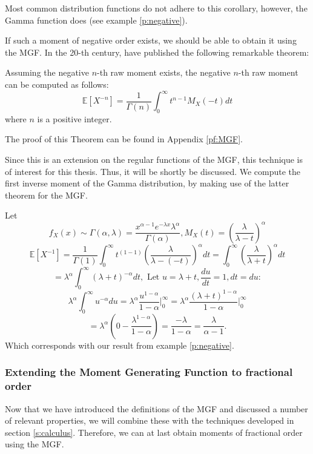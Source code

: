 Most common distribution functions do not adhere to this corollary, however, the Gamma function does (see example \ref{p:negative}).

If such a moment of negative order exists, we should be able to obtain it using the MGF. In the 20-th century, \citet{cressie1981} have published the following remarkable theorem:

\begin{theorem}\label{t: negative}
    Assuming the negative \(n\)-th raw moment exists, the negative \(n\)-th raw moment can be computed as follows: 
    \[\mathbb{E}[X^{-n}] = \frac{1}{\Gamma(n)} \int_{0}^{\infty} t^{n- 1} M_X(-t) dt\] where \(n\) is a positive integer.
\end{theorem}
The proof of this Theorem can be found in Appendix \ref{pf:MGF}.

Since this is an extension on the regular functions of the MGF, this technique is of interest for this thesis. Thus, it will be shortly be discussed. We compute the first inverse moment of the Gamma distribution, by making use of the latter theorem for the MGF.

\begin{example}
    Let \[f_X(x) \sim \Gamma(\alpha, \lambda) = 
    \frac{x^{\alpha -1} e^{-\lambda x} \lambda^\alpha} {\Gamma(\alpha)}, M_X(t) = \left(\frac{\lambda}{\lambda - t}\right)^\alpha\]
    \[\mathbb{E}[X^{-1}] = \frac{1}{\Gamma(1)} \int_{0}^{\infty} t^{( 1 - 1)} \left(\frac{\lambda}{\lambda - (-t)}\right)^\alpha dt =  \int_{0}^{\infty} \left(\frac{\lambda}{\lambda + t}\right)^\alpha dt\]
    \[ = \lambda^\alpha \int_{0}^{\infty} (\lambda + t)^{-\alpha} dt, \text{ Let } u = \lambda + t, \frac{du}{dt} = 1, dt = du:\]
    \[ \lambda^\alpha \int_{0}^{\infty} u^{-\alpha} du
    =  \lambda^\alpha \frac{u^{ 1-\alpha}}{1 -\alpha}\Big|_{0}^{\infty} = \lambda^\alpha \frac{(\lambda + t)^{1 -\alpha}}{1 -\alpha}\Big|_{0}^{\infty}\]
    \[= \lambda^\alpha\left( 0 - \frac{\lambda^{ 1 - \alpha}}{1 -\alpha}\right) = \frac{-\lambda}{ 1 - \alpha} = \frac{\lambda}{\alpha - 1}.\] Which corresponds with our result from example \ref{p:negative}.
\end{example}

\subsubsection{Extending the Moment Generating Function to fractional order}
Now that we have introduced the definitions of the MGF and discussed a number of relevant properties, we will combine these with the techniques developed in section \ref{s:calculus}. Therefore, we can at last obtain moments of fractional order using the MGF.


